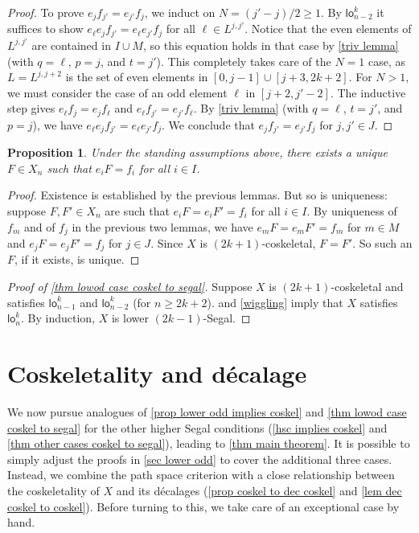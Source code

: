 \documentclass{amsart}
\newcommand{\lowod}{\mathsf{lo}}
\newtheorem{proposition}[theorem]{Proposition}
\theoremstyle{definition}
\theoremstyle{remark}
\begin{document}
\begin{proof}
To prove $e_j f_{j'} = e_{j'} f_j$, we induct on $N = (j'-j)/2 \geq 1$.
By $\lowod_{n-2}^k$ it suffices to show $e_\ell e_j f_{j'} = e_\ell e_{j'} f_j$ for all $\ell \in L^{j,j'}$.
Notice that the even elements of $L^{j,j'}$ are contained in $I\cup M$, so this equation holds in that case by \cref{triv lemma} (with $q=\ell$, $p=j$, and $t=j'$).
This completely takes care of the $N=1$ case, as $L=L^{j,j+2}$ is the set of even elements in $[0,j-1] \cup [j+3, 2k+2]$.
For  $N > 1$, we must consider the case of an odd element $\ell$ in $[j+2,j'-2]$.
The inductive step gives $e_\ell f_j = e_j f_\ell$ and $e_\ell f_{j'} = e_{j'} f_\ell$. 
By \cref{triv lemma} (with $q=\ell$, $t=j'$, and $p=j$), we have $e_\ell e_j f_{j'} = e_\ell e_{j'} f_j$. 
We conclude that $e_j f_{j'} = e_{j'} f_j$ for $j,j' \in J$.
\end{proof}


\begin{proposition}\label{prop lowod unique fill}
Under the standing assumptions above, there exists a unique $F\in X_n$ such that $e_i F = f_i$ for all $i\in I$.
\end{proposition}
\begin{proof}
Existence is established by the previous lemmas. 
But so is uniqueness: suppose $F, F' \in X_n$ are such that $e_i F = e_i F' = f_i$ for all $i\in I$.
By uniqueness of $f_m$ and of $f_j$ in the previous two lemmas, we have $e_m F = e_m F' = f_m$ for $m\in M$ and $e_j F = e_j F' = f_j$ for $j\in J$.
Since $X$ is $(2k{+}1)$-coskeletal, $F = F'$. So such an $F$, if it exists, is unique.
\end{proof}

\begin{proof}[Proof of \cref{thm lowod case coskel to segal}]
Suppose $X$ is $(2k{+}1)$-coskeletal and satisfies $\lowod_{n-1}^k$ and $\lowod_{n-2}^k$ (for $n\geq 2k+2$).
 and \cref{wiggling} imply that $X$ satisfies $\lowod_n^k$. By induction, $X$ is lower $(2k{-}1)$-Segal.
\end{proof}

\section{Coskeletality and d\'ecalage}
We now pursue analogues of \cref{prop lower odd implies coskel} and \cref{thm lowod case coskel to segal} for the other higher Segal conditions (\cref{hsc implies coskel} and \cref{thm other cases coskel to segal}), leading to \cref{thm main theorem}.
It is possible to simply adjust the proofs in \cref{sec lower odd} to cover the additional three cases.
Instead, we combine the path space criterion with a close relationship between the coskeletality of $X$ and its d\'ecalages (\cref{prop coskel to dec coskel} and \cref{lem dec coskel to coskel}).
Before turning to this, we take care of an exceptional case by hand.
\end{document}
